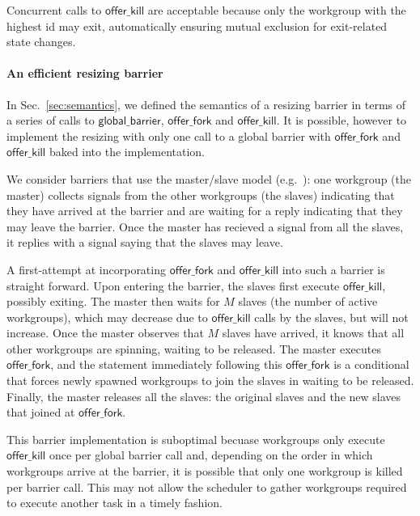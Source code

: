 \documentclass[numbers,nocopyrightspace,10pt]{sigplanconf}
\newcommand{\mysec}{Sec.~}
\newcommand{\offerfork}{\mathsf{offer\_fork}}
\newcommand{\offerkill}{\mathsf{offer\_kill}}
\newcommand{\globalbarrier}{\mathsf{global\_barrier}}
\begin{document}
Concurrent calls to $\offerkill$ are acceptable because only the
workgroup with the highest id may exit, automatically ensuring mutual
exclusion for exit-related state changes.

\paragraph{An efficient resizing barrier}

In \mysec\ref{sec:semantics}, we defined the semantics of a resizing barrier in terms
of a series of calls to $\globalbarrier$, $\offerfork$ and $\offerkill$.
 It is possible, however to implement the resizing with
only one call to a global barrier with $\offerfork$ and $\offerkill$
baked into the implementation. 

We consider barriers that use the master/slave model
(e.g.\ \cite{XF10}): one workgroup (the master) collects signals
from the other workgroups (the slaves) indicating that they have
arrived at the barrier and are waiting for a reply indicating that
they may leave the barrier. Once the master has recieved a signal from
all the slaves, it replies with a signal saying that the slaves may
leave. 

A first-attempt at incorporating $\offerfork$ and $\offerkill$ into
such a barrier is straight forward. Upon entering the barrier, the
slaves first execute $\offerkill$, possibly exiting. The master then
waits for $M$ slaves (the number of active workgroups), which may
decrease due to $\offerkill$ calls by the
slaves, but will not increase. Once the master observes that $M$ slaves
have arrived, it knows that all other workgroups are spinning, waiting to be released. The master executes $\offerfork$,
and the statement immediately following this $\offerfork$ is a conditional that forces newly spawned workgroups to join the
slaves in waiting to be released. Finally, the master
releases all the slaves: the original slaves and the new slaves that
joined at $\offerfork$.

This barrier implementation is suboptimal becuase workgroups only
execute $\offerkill$ once per global barrier call and, depending on
the order in which workgroups arrive at the barrier, it is possible
that only one workgroup is killed per barrier call.  This may not
allow the scheduler to gather workgroups required to execute another
task in a timely fashion.
\end{document}
